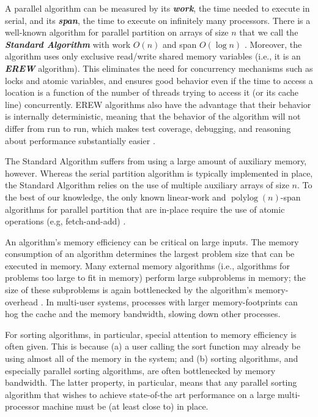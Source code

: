 \documentclass[twoside,leqno,twocolumn]{article}
\newcommand{\polylog}{\operatorname{polylog}}
\newcommand{\defn}[1]{{\textit{\textbf{\boldmath #1}}}}
\begin{document}
A parallel algorithm can be measured by its \defn{work}, the time
needed to execute in serial, and its \defn{span}, the time to execute
on infinitely many processors. There is a well-known algorithm for
parallel partition on arrays of size $n$ that we call the
\defn{Standard Algorithm} with work $O(n)$ and span
$O(\log n)$ \cite{Blelloch96,AcarBl16}. Moreover, the algorithm uses
only exclusive read/write shared memory variables (i.e., it is an
\defn{EREW} algorithm). This eliminates the need for concurrency
mechanisms such as locks and atomic variables, and ensures good
behavior even if the time to access a location is a function of the
number of threads trying to access it (or its cache line)
concurrently. EREW algorithms also have the advantage that their
behavior is internally deterministic, meaning that
the behavior of the algorithm will not differ from run to run, which
makes test coverage, debugging, and reasoning about performance
substantially easier \cite{BlellochFi12}.

The Standard Algorithm suffers from using a large amount of
auxiliary memory, however. Whereas the serial partition algorithm is typically
implemented in place, the Standard Algorithm relies on the use of multiple
auxiliary arrays of size $n$. To the best of our knowledge, the only
known linear-work and $\polylog(n)$-span algorithms for
parallel partition that are in-place require the use of atomic
operations (e.g, fetch-and-add)
\cite{HeidelbergerNo90,AxtmannWi17,TsigasZh03}.

An algorithm's memory efficiency can be critical on large inputs. The
memory consumption of an algorithm determines the largest problem size
that can be executed in memory. Many external memory algorithms (i.e.,
algorithms for problems too large to fit in memory) perform large
subproblems in memory; the size of these subproblems is again
bottlenecked by the algorithm's memory-overhead \cite{Vitter08}. In
multi-user systems, processes with larger memory-footprints can hog
the cache and the memory bandwidth, slowing down other processes.

For sorting algorithms, in particular, special attention to memory
efficiency is often given. This is because (a) a user calling the sort
function may already be using almost all of the memory in the system;
and (b) sorting algorithms, and especially parallel sorting
algorithms, are often bottlenecked by memory bandwidth. The latter
property, in particular, means that any parallel sorting algorithm
that wishes to achieve state-of-the art performance on a large
multi-processor machine must be (at least close to) in place.
\end{document}
